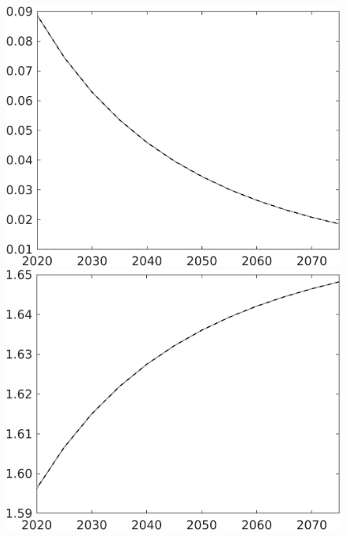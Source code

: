 \documentclass[12pt]{article}
\begin{document}
\begin{figure}[h!!]
\begin{minipage}[]{0.32\textwidth}
	\end{minipage}	
	\begin{minipage}[]{0.32\textwidth}
		\includegraphics[width=1\textwidth]{../../codding_model/own_basedOnFried/optimalPol_010922_revision/figures/all_13Sept22/CompTaul_Equlab_LFBAU_Reg0_pee_spillover0_nsk0_xgr0_knspil1_sep1_countec0_GovRev0_etaa0.79_lgd0.png}
	\end{minipage}	
	\begin{minipage}[]{0.32\textwidth}
		\includegraphics[width=1\textwidth]{../../codding_model/own_basedOnFried/optimalPol_010922_revision/figures/all_13Sept22/CompTaul_Equlab_LFBAU_Reg0_pn_spillover0_nsk0_xgr0_knspil1_sep1_countec0_GovRev0_etaa0.79_lgd0.png}

\end{minipage}
\end{figure}
\end{document}

